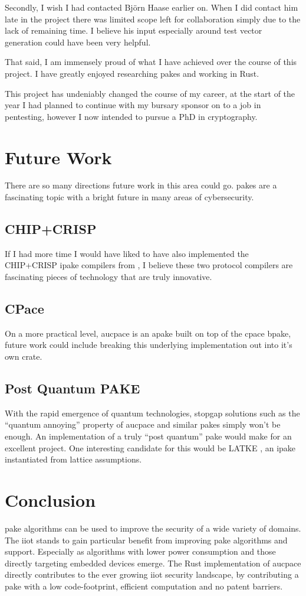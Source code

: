 Secondly, I wish I had contacted Bj\"orn Haase earlier on.
When I did contact him late in the project there was limited scope left for collaboration simply due to the lack of remaining time.
I believe his input especially around test vector generation could have been very helpful.

That said, I am immensely proud of what I have achieved over the course of this project.
I have greatly enjoyed researching \glspl{pake} and working in Rust.

This project has undeniably changed the course of my career, at the start of the year I had planned to continue with my bursary sponsor on to a job in pentesting, however I now intended to pursue a PhD in cryptography.

\section{Future Work}
There are so many directions future work in this area could go.
\glspl{pake} are a fascinating topic with a bright future in many areas of cybersecurity.

\subsection{CHIP+CRISP}
If I had more time I would have liked to have also implemented the CHIP+CRISP \gls{ipake} compilers from \citeauthor{chip+crisp}, I believe these two protocol compilers are fascinating pieces of technology that are truly innovative.

\subsection{CPace}
On a more practical level, \gls{aucpace} is an \gls{apake} built on top of the \gls{cpace} \gls{bpake}, future work could include breaking this underlying implementation out into it's own crate.

\subsection{Post Quantum PAKE}
With the rapid emergence of quantum technologies, stopgap solutions such as the \enquote{quantum annoying} property of \gls{aucpace} and similar \glspl{pake} simply won't be enough.
An implementation of a truly \enquote{post quantum} \gls{pake} would make for an excellent project.
One interesting candidate for this would be LATKE \cite{latke}, an \gls{ipake} instantiated from lattice assumptions.

\section{Conclusion}
\gls{pake} algorithms can be used to improve the security of a wide variety of domains.
The \gls{iiot} stands to gain particular benefit from improving \gls{pake} algorithms and support.
Especially as algorithms with lower power consumption and those directly targeting embedded devices emerge.
The Rust implementation of \gls{aucpace} directly contributes to the ever growing \gls{iiot} security landscape, by contributing a \gls{pake} with a low code-footprint, efficient computation and no patent barriers.
